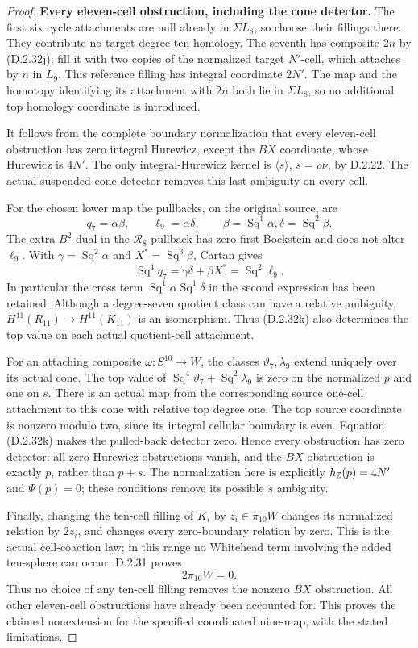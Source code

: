 \begin{proof}
\medskip\noindent
\textbf{Every eleven-cell obstruction, including the cone detector.}
The first six cycle attachments are null already in
$\Sigma L_8$, so choose their fillings there. They contribute
no target degree-ten homology. The seventh has composite
$2n$ by (D.2.32j); fill it with two copies of the normalized
target $N'$-cell, which attaches by $n$ in $L_9$.
This reference filling has integral coordinate $2N'$.
The map and the homotopy identifying its attachment with
$2n$ both lie in $\Sigma L_8$, so no additional top
homology coordinate is introduced.

It follows from the complete boundary normalization that
every eleven-cell obstruction has zero integral Hurewicz,
except the $BX$ coordinate, whose Hurewicz is $4N'$.
The only integral-Hurewicz kernel is $\langle s\rangle$,
$s=\rho\nu$, by D.2.22. The actual suspended cone
detector removes this last ambiguity on every cell.

For the chosen lower map the pullbacks, on the original
source, are
\[
 q_7=\alpha\beta,\qquad \ell_9=\alpha\delta,
 \qquad \beta=\operatorname{Sq}^1\alpha,
        \delta=\operatorname{Sq}^2\beta.
\]
The extra $B^2$-dual in the $\mathcal R_8$ pullback has
zero first Bockstein and does not alter $\ell_9$.
With $\gamma=\operatorname{Sq}^2\alpha$ and
$X^*=\operatorname{Sq}^3\beta$, Cartan gives
\[
 \operatorname{Sq}^4q_7=
       \gamma\delta+\beta X^*
       =\operatorname{Sq}^2\ell_9.
 \tag{D.2.32k}
\]
In particular the cross term
$\operatorname{Sq}^1\alpha\operatorname{Sq}^1\delta$
in the second expression has been retained.
Although a degree-seven quotient class can have a relative
ambiguity, $H^{11}(R_{11})\to H^{11}(K_{11})$ is an
isomorphism. Thus (D.2.32k) also determines the top value
on each actual quotient-cell attachment.

For an attaching composite $\omega:S^{10}\to W$, the
classes $\vartheta_7,\lambda_9$ extend uniquely over its
actual cone. The top value of
$\operatorname{Sq}^4\vartheta_7+\operatorname{Sq}^2\lambda_9$
is zero on the normalized $p$ and one on $s$.
There is an actual map from the corresponding source
one-cell attachment to this cone with relative top degree
one. The top source coordinate is nonzero modulo two,
since its integral cellular boundary is even. Equation
(D.2.32k) makes the pulled-back detector zero. Hence
every obstruction has zero detector: all zero-Hurewicz
obstructions vanish, and the $BX$ obstruction is exactly
$p$, rather than $p+s$.
The normalization here is explicitly
$h_{\mathbb Z}(p)=4N'$ and $\Psi(p)=0$; these conditions remove
its possible $s$ ambiguity.

Finally, changing the ten-cell filling of $K_i$ by
$z_i\in\pi_{10}W$ changes its normalized relation by
$2z_i$, and changes every zero-boundary relation by zero.
This is the actual cell-coaction law; in this range no
Whitehead term involving the added ten-sphere can occur.
D.2.31 proves
\[
                  2\pi_{10}W=0.
 \tag{D.2.32l}
\]
Thus no choice of any ten-cell filling removes the
nonzero $BX$ obstruction. All other eleven-cell
obstructions have already been accounted for. This
proves the claimed nonextension for the specified
coordinated nine-map, with the stated limitations.
\end{proof}
